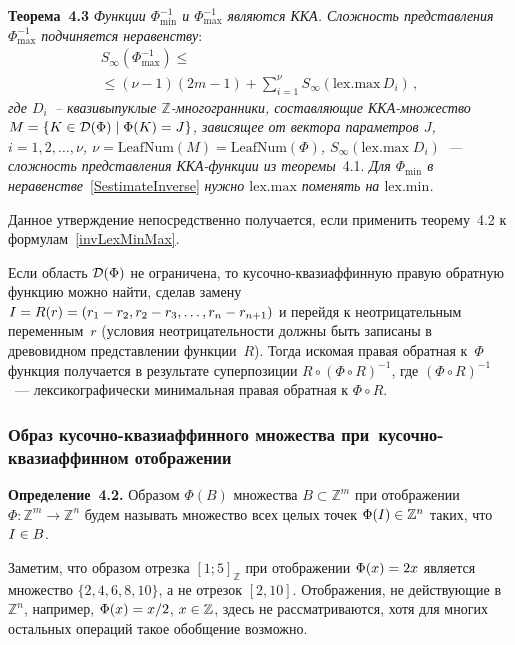 \begin{multicols}{2}
\smallskip

\noindent
\textbf{Теорема~4.3}
\textit{Функции $\Phi^{-1}_{\min}$ и $\Phi^{-1}_{\max}$ являются
ККА. Сложность представления $\Phi^{-1}_{\max}$
подчиняется неравенству}:
\begin{multline}
S_\infty(\Phi^{-1}_{\max})\leq{}\\
{}\leq (\nu-1)(2m-1) + 
\sum\limits_{i=1}^\nu S_\infty(\mathrm{lex.max}\,D_i)\,, 
\label{SestimateInverse}
\end{multline}
\textit{где $D_i$~-- квазивыпуклые $\mathbb{Z}$-многогранники, со\-став\-ля\-ющие
ККА-множество $M=\{K\in{\cal D}(\Phi)\mid\Phi(K)=J\}$, зависящее от
вектора параметров $J$, $i=1,2,\ldots,\nu$,
$\nu=\mathrm{LeafNum}(M)=\mathrm{LeafNum}(\Phi)$,
$S_\infty(\mathrm{lex.max}\;D_i)$~--- сложность представления
ККА-функ\-ции из теоремы}~4.1. \textit{Для $\Phi_{\min}$ в неравенстве}~\eqref{SestimateInverse} 
\textit{нужно $\mathrm{lex.max}$ поменять на
$\mathrm{lex.min}$.}

\smallskip

Данное утверждение непосредственно получается, если применить
теорему~4.2 к формулам~\eqref{invLexMinMax}.

Если область ${\cal D}(\Phi)$ не ограничена, то
ку\-соч\-но-ква\-зи\-аф\-фин\-ную правую обратную функцию можно найти, сделав
замену $I\hm=R(r)\hm=(r_1\hm-r_2,r_2\hm-r_3,\ldots,r_n\hm-r_{n+1})$ и перейдя к
неотрицательным переменным~$r$ (условия неотрицательности должны
быть записаны в древовидном пред\-став\-ле\-нии функции~$R$). Тогда
искомая правая обратная к~$\Phi$ функция получается в результате
суперпозиции $R\circ(\Phi\circ R)^{-1}$, где $(\Phi\circ R)^{-1}$~---
лексикографически минимальная правая обрат\-ная к $\Phi\circ R$.

\subsubsection{Образ кусочно-квазиаффинного 
множества при~кусочно-квазиаффинном отображении} %

\noindent
\textbf{Определение~4.2.}
Образом $\Phi(B)$ множества $B\subset \mathbb{Z}^m$ при отобра\-же\-нии
$\Phi:\mathbb{Z}^m\to\mathbb{Z}^n$ будем называть множество всех
целых точек $\Phi(I)\hm\in \mathbb{Z}^n$ таких, что $I\hm\in B$.

\smallskip

Заметим, что образом отрезка $[1;5]_\mathbb{Z}$ при отобра\-же\-нии
$\Phi(x)\hm=2x$ является мно\-жест\-во $\{2,4,6,8,10\}$, а не отрезок
$[2,10]$. Отображения, не дейст\-ву\-ющие в $\mathbb{Z}^n$, например,
$\Phi(x)\hm={x}/2$, $x\hm\in\mathbb{Z}$, здесь не рас\-смат\-ри\-ва\-ют\-ся,
хотя для многих остальных операций такое обобщение возможно.


\end{multicols}
